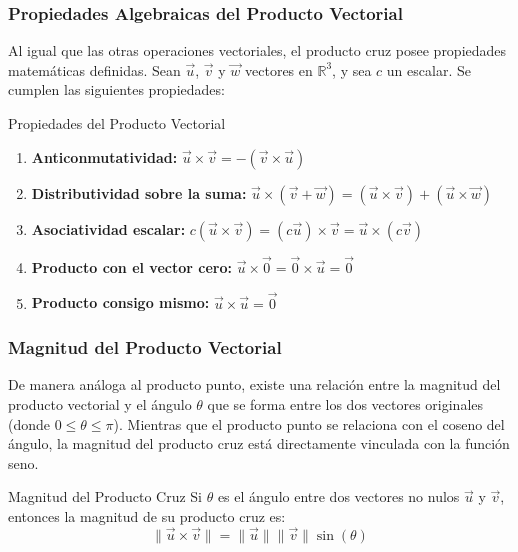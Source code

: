 \subsubsection{Propiedades Algebraicas del Producto Vectorial}

Al igual que las otras operaciones vectoriales, el producto cruz posee propiedades matemáticas definidas. Sean $\vec{u}$, $\vec{v}$ y $\vec{w}$ vectores en $\mathbb{R}^3$, y sea $c$ un escalar. Se cumplen las siguientes propiedades:

\begin{mytheorem}{Propiedades del Producto Vectorial}
\begin{enumerate}
    \item \textbf{Anticonmutatividad:} $\vec{u} \times \vec{v} = -(\vec{v} \times \vec{u})$
    \item \textbf{Distributividad sobre la suma:} $\vec{u} \times (\vec{v} + \vec{w}) = (\vec{u} \times \vec{v}) + (\vec{u} \times \vec{w})$
    \item \textbf{Asociatividad escalar:} $c(\vec{u} \times \vec{v}) = (c\vec{u}) \times \vec{v} = \vec{u} \times (c\vec{v})$
    \item \textbf{Producto con el vector cero:} $\vec{u} \times \vec{0} = \vec{0} \times \vec{u} = \vec{0}$
    \item \textbf{Producto consigo mismo:} $\vec{u} \times \vec{u} = \vec{0}$
\end{enumerate}
\end{mytheorem}

\subsubsection{Magnitud del Producto Vectorial}

De manera análoga al producto punto, existe una relación entre la magnitud del producto vectorial y el ángulo $\theta$ que se forma entre los dos vectores originales (donde $0 \leq \theta \leq \pi$). Mientras que el producto punto se relaciona con el coseno del ángulo, la magnitud del producto cruz está directamente vinculada con la función seno.

\begin{mytheorem}{Magnitud del Producto Cruz}
Si $\theta$ es el ángulo entre dos vectores no nulos $\vec{u}$ y $\vec{v}$, entonces la magnitud de su producto cruz es:
\[ \|\vec{u} \times \vec{v}\| = \|\vec{u}\| \|\vec{v}\| \sin(\theta) \]
\end{mytheorem}

